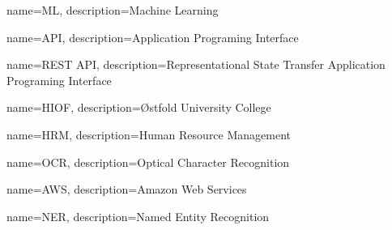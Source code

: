 \usepackage{glossaries}
\makeglossaries

 {
    name=ML,
    description={Machine Learning}
}

 {
    name=API,
    description={Application Programing Interface}
}

 {
    name=REST API,
    description={Representational State Transfer Application Programing Interface}
}

 {
    name=HIOF,
    description={Østfold University College}
}

 {
    name=HRM,
    description={Human Resource Management}
}

 {
    name=OCR,
    description={Optical Character Recognition}
}

 {
    name=AWS,
    description={Amazon Web Services}
}





 {
    name=NER,
    description={Named Entity Recognition}
}
